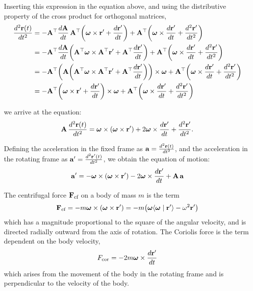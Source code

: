 \documentclass[12pt]{article}
\newcommand{\ip}[2]{\langle #1 \mid #2 \rangle}
\begin{document}
Inserting this expression in the equation above, and using the distributive property of the
cross product for orthogonal matrices,
\begin{equation}
  \begin{aligned}
    \frac{d^2\vb{r}(t)}{dt^2}
    &= -\vb{A}^\top\frac{d\vb{A}}{dt}\,\vb{A}^\top
       \!\left(\boldsymbol{\omega}\times\vb{r}' + \frac{d\vb{r}'}{dt}\right)
       + \vb{A}^\top\!\left(\boldsymbol{\omega}\times\frac{d\vb{r}'}{dt} + \frac{d^2\vb{r}'}{dt^2}\right) \\
    &= -\vb{A}^\top\frac{d\vb{A}}{dt}
       \!\left(\vb{A}^\top\boldsymbol{\omega}\times\vb{A}^\top\vb{r}'
         + \vb{A}^\top\frac{d\vb{r}'}{dt}\right)
       + \vb{A}^\top\!\left(\boldsymbol{\omega}\times\frac{d\vb{r}'}{dt} + \frac{d^2\vb{r}'}{dt^2}\right) \\
    &= -\vb{A}^\top\!\left(\vb{A}\!\left(\vb{A}^\top\boldsymbol{\omega}\times\vb{A}^\top\vb{r}'
         + \vb{A}^\top\frac{d\vb{r}'}{dt}\right)\right)\times\boldsymbol{\omega}
       + \vb{A}^\top\!\left(\boldsymbol{\omega}\times\frac{d\vb{r}'}{dt} + \frac{d^2\vb{r}'}{dt^2}\right) \\
    &= -\vb{A}^\top\!\left(\boldsymbol{\omega}\times\vb{r}' + \frac{d\vb{r}'}{dt}\right)\times\boldsymbol{\omega}
       + \vb{A}^\top\!\left(\boldsymbol{\omega}\times\frac{d\vb{r}'}{dt} + \frac{d^2\vb{r}'}{dt^2}\right)
  \end{aligned}
\end{equation}

we arrive at the equation:
\begin{equation}
  \vb{A}\,\frac{d^2\vb{r}(t)}{dt^2} =
    \boldsymbol{\omega}\times(\boldsymbol{\omega}\times\vb{r}')
    + 2\boldsymbol{\omega}\times\frac{d\vb{r}'}{dt}
    + \frac{d^2\vb{r}'}{dt^2}.
\end{equation}

Defining the acceleration in the fixed frame as $\vb{a} = \frac{d^2\vb{r}(t)}{dt^2}$, and
the acceleration in the rotating frame as $\vb{a}' = \frac{d^2\vb{r}'(t)}{dt^2}$, we obtain
the equation of motion:
\begin{equation}
  \vb{a}' = -\boldsymbol{\omega}\times(\boldsymbol{\omega}\times\vb{r}')
    - 2\boldsymbol{\omega}\times\frac{d\vb{r}'}{dt}
    + \vb{A}\,\vb{a}
  \label{eq:eom_rotating}
\end{equation}

The centrifugal force $\vb{F}_\text{cf}$ on a body of mass $m$ is the term
\begin{equation}
  \vb{F}_\text{cf} = -m\boldsymbol{\omega}\times(\boldsymbol{\omega}\times\vb{r}')
    = -m\bigl(\boldsymbol{\omega}\ip{\boldsymbol{\omega}}{\vb{r}'} - \omega^2\vb{r}'\bigr)
  \label{eq:centrifugal}
\end{equation}
which has a magnitude proportional to the square of the angular velocity, and is directed
radially outward from the axis of rotation. The Coriolis force is the term dependent on the
body velocity,
\begin{equation}
  F_\text{cor} = -2m\boldsymbol{\omega}\times\frac{d\vb{r}'}{dt}
  \label{eq:coriolis}
\end{equation}
which arises from the movement of the body in the rotating frame and is perpendicular to the
velocity of the body.
\end{document}
